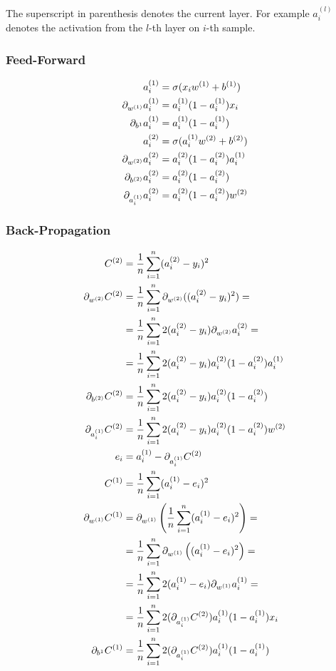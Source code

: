 \documentclass{article}
\begin{document}
The superscript in parenthesis denotes the current layer. For example $a_i^{(l)}$ denotes the activation from the $l$-th layer on $i$-th sample.

\subsubsection{Feed-Forward}

\begin{align}
  a_i^{(1)} &= \sigma(x_iw^{(1)} + b^{(1)}) \\
  \pd[w^{(1)}]a_i^{(1)} &= a_i^{(1)}(1 - a_i^{(1)})x_i \\
  \pd[b^{1}]a_i^{(1)} &= a_i^{(1)}(1 - a_i^{(1)}) \\
  a_i^{(2)} &= \sigma(a_i^{(1)}w^{(2)} + b^{(2)}) \\
  \pd[w^{(2)}]a_i^{(2)} &= a_i^{(2)}(1 - a_i^{(2)})a_i^{(1)} \\
  \pd[b^{(2)}]a_i^{(2)} &= a_i^{(2)}(1 - a_i^{(2)}) \\
  \pd[a_i^{(1)}]a_i^{(2)} &= a_i^{(2)}(1 - a_i^{(2)})w^{(2)}
\end{align}

\subsubsection{Back-Propagation}

\begin{align}
  C^{(2)} &= \avgsum[i, n] (a_i^{(2)} - y_i)^2 \\
  \pd[w^{(2)}] C^{(2)}
            &= \avgsum[i, n] \pd[w^{(2)}]((a_i^{(2)} - y_i)^2) = \\
            &= \avgsum[i, n] 2(a_i^{(2)} - y_i)\pd[w^{(2)}]a_i^{(2)} = \\
            &= \avgsum[i, n] 2(a_i^{(2)} - y_i)a_i^{(2)}(1 - a_i^{(2)})a_i^{(1)} \\
  \pd[b^{(2)}] C^{(2)} &= \avgsum[i, n] 2(a_i^{(2)} - y_i)a_i^{(2)}(1 - a_i^{(2)}) \\
  \pd[a_i^{(1)}]C^{(2)} &= \avgsum[i, n] 2(a_i^{(2)} - y_i)a_i^{(2)}(1 - a_i^{(2)})w^{(2)} \\
  e_i &= a_i^{(1)} - \pd[a_i^{(1)}]C^{(2)} \\
  C^{(1)} &= \avgsum[i, n] (a_i^{(1)} - e_i)^2 \\
  \pd[w^{(1)}]C^{(1)}
            &= \pd[w^{(1)}]\left(\avgsum[i, n] (a_i^{(1)} - e_i)^2\right) =\\
            &= \avgsum[i, n] \pd[w^{(1)}]\left((a_i^{(1)} - e_i)^2\right) =\\
            &= \avgsum[i, n] 2(a_i^{(1)} - e_i)\pd[w^{(1)}]a_i^{(1)} =\\
            &= \avgsum[i, n] 2(\pd[a_i^{(1)}]C^{(2)})a_i^{(1)}(1 - a_i^{(1)})x_i \\
  \pd[b^{1}]C^{(1)} &= \avgsum[i, n] 2(\pd[a_i^{(1)}]C^{(2)})a_i^{(1)}(1 - a_i^{(1)})
\end{align}
\end{document}
